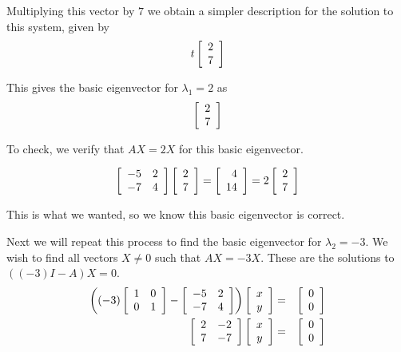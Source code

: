 \begin{solution}
Multiplying this vector by $7$ we obtain a simpler description for the solution to this system, given by
\[
t \left[ \begin{array}{r}
2 \\
7
\end{array} \right]
\]

This gives the basic eigenvector for $\lambda_1 = 2$ as 
\[
\left[ \begin{array}{r}
2\\
7
\end{array} \right]
\]

To check, we verify that $AX = 2X$ for this basic eigenvector. 

\[
\left[ \begin{array}{rr}
-5 & 2 \\
-7 & 4
\end{array}\right] 
\left[ \begin{array}{r}
2 \\
7
\end{array} \right]
=
\left[ \begin{array}{r}
4 \\
14
\end{array}\right]
=
2
\left[ \begin{array}{r}
2\\
7
\end{array}
\right]
\]

This is what we wanted, so we know this basic eigenvector is correct. 

Next we will repeat this process to find the basic eigenvector for $\lambda_2 = -3$. We wish to find all vectors $X \neq 0$ such that $AX = -3X$. These are the solutions to $((-3)I-A)X = 0$. 
\begin{eqnarray*}
\left( 
(-3) \left[ \begin{array}{rr}
1 & 0 \\
0 & 1 
\end{array}\right] - 
\left[ \begin{array}{rr}
-5 & 2 \\
-7 & 4
\end{array}\right]  \right) \left[ \begin{array}{c}
x \\
y 
\end{array}\right] &=& \left[ \begin{array}{r}
0 \\
0
\end{array} \right] \\
\left[ \begin{array}{rr}
2 & -2 \\
7 & -7
\end{array}\right] \left[ \begin{array}{c}
x \\
y 
\end{array}\right] &=& \left[ \begin{array}{r}
0 \\
0
\end{array} \right] 
\end{eqnarray*}


\end{solution}
